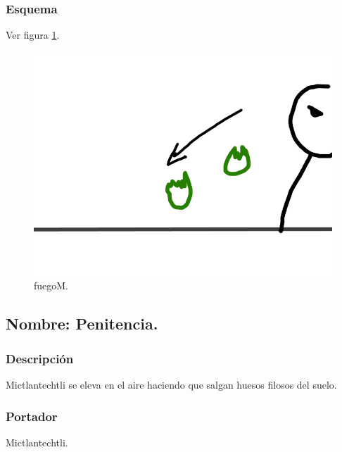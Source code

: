 \documentclass[11pt,letterpaper]{article}
\begin{document}
\subsubsection{Esquema}	
			Ver figura \ref{fig:fuegoM}.
			\begin{figure}
				\centering
				\includegraphics[height=0.2 \textheight]{Imagenes/fuegoM}
				\caption{fuegoM.}
				\label{fig:fuegoM}
			\end{figure}
\subsection{Nombre: Penitencia.}
\subsubsection{Descripción}
Mictlantechtli se eleva en el aire haciendo que salgan huesos filosos del suelo.
\subsubsection{Portador}
Mictlantechtli.
\end{document}
